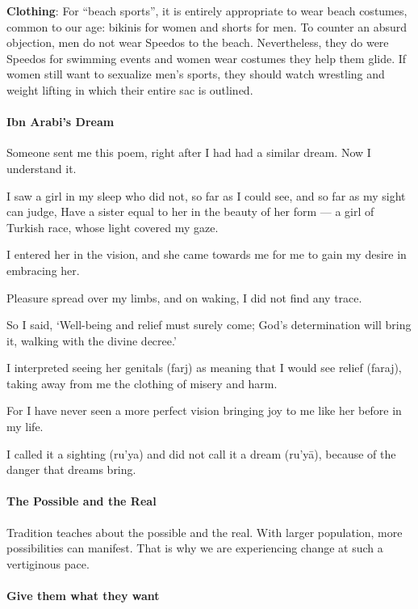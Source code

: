 \textbf{Clothing}: For ``beach sports'', it is entirely appropriate to wear beach costumes, common to our age: bikinis for women and shorts for men. To counter an absurd objection, men do not wear Speedos to the beach. Nevertheless, they do were Speedos for swimming events and women wear costumes they help them glide. If women still want to sexualize men's sports, they should watch wrestling and weight lifting in which their entire sac is outlined.

\paragraph{Ibn Arabi's Dream}


Someone sent me this poem, right after I had had a similar dream. Now I understand it.

\begin{quotex}
I saw a girl in my sleep who did not, so far as I could see, and so far as my sight can judge, Have a sister equal to her in the beauty of her form --- a girl of Turkish race, whose light covered my gaze. 

I entered her in the vision, and she came towards me for me to gain my desire in embracing her.

Pleasure spread over my limbs, and on waking, I did not find any trace.

So I said, `Well-being and relief must surely come; God's determination will bring it, walking with the divine decree.'

I interpreted seeing her genitals (farj) as meaning that I would see relief (faraj), taking away from me the clothing of misery and harm.

For I have never seen a more perfect vision bringing joy to me like her before in my life.

I called it a sighting (ru'ya) and did not call it a dream (ru'yā), because of the danger that dreams bring.
\end{quotex}


\paragraph{The Possible and the Real}


Tradition teaches about the possible and the real. With larger population, more possibilities can manifest. That is why we are experiencing change at such a vertiginous pace.

\paragraph{Give them what they want}


